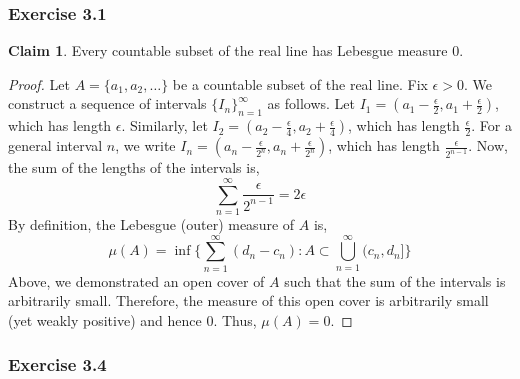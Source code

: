 \documentclass[letterpaper,12pt]{article}
\theoremstyle{definition}
\newtheorem{claim}[theorem]{Claim}
\begin{document}
\subsubsection*{Exercise 3.1}
\begin{claim}
  Every countable subset of the real line has Lebesgue measure $0$.
\end{claim}
\begin{proof}
  Let $A = \{a_1, a_2, \ldots \}$ be a countable subset of the real line. Fix $\epsilon > 0$. We construct a sequence of intervals $\{I_n\}_{n=1}^{\infty}$ as follows. Let $I_1 = (a_1 - \frac{\epsilon}{2}, a_1 + \frac{\epsilon}{2})$, which has length $\epsilon$. Similarly, let $I_2 = (a_2 - \frac{\epsilon}{4}, a_2 + \frac{\epsilon}{4})$, which has length $\frac{\epsilon}{2}$. For a general interval $n$, we write $I_n = (a_n - \frac{\epsilon}{2^n}, a_n + \frac{\epsilon}{2^n})$, which has length $\frac{\epsilon}{2^{n-1}}$. Now, the sum of the lengths of the intervals is,
  \begin{equation}
    \sum_{n=1}^{\infty} \frac{\epsilon}{2^{n-1}} = 2\epsilon
  \end{equation}
  By definition, the Lebesgue (outer) measure of $A$ is,
  \begin{equation}
    \mu(A) = \inf\{\sum_{n=1}^{\infty} (d_n - c_n) : A \subset \bigcup\limits_{n=1}^{\infty} (c_n, d_n] \}
  \end{equation}
  Above, we demonstrated an open cover of $A$ such that the sum of the intervals is arbitrarily small. Therefore, the measure of this open cover is arbitrarily small (yet weakly positive) and hence 0. Thus, $\mu(A) = 0$.
\end{proof}

\subsubsection*{Exercise 3.4}
\end{document}
